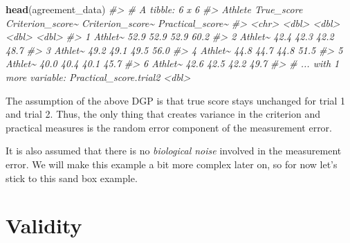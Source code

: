 \documentclass[
]{book}
\newenvironment{Shaded}{\begin{snugshade}}{\end{snugshade}}
\newcommand{\CommentTok}[1]{\textcolor[rgb]{0.56,0.35,0.01}{\textit{#1}}}
\newcommand{\KeywordTok}[1]{\textcolor[rgb]{0.13,0.29,0.53}{\textbf{#1}}}
\newcommand{\NormalTok}[1]{#1}
\begin{document}
\begin{Shaded}
\begin{Highlighting}[]
\KeywordTok{head}\NormalTok{(agreement\_data)}
\CommentTok{\#> \# A tibble: 6 x 6}
\CommentTok{\#>   Athlete True\_score Criterion\_score\textasciitilde{} Criterion\_score\textasciitilde{} Practical\_score\textasciitilde{}}
\CommentTok{\#>   <chr>        <dbl>            <dbl>            <dbl>            <dbl>}
\CommentTok{\#> 1 Athlet\textasciitilde{}       52.9             52.9             52.9             60.2}
\CommentTok{\#> 2 Athlet\textasciitilde{}       42.4             42.3             42.2             48.7}
\CommentTok{\#> 3 Athlet\textasciitilde{}       49.2             49.1             49.5             56.0}
\CommentTok{\#> 4 Athlet\textasciitilde{}       44.8             44.7             44.8             51.5}
\CommentTok{\#> 5 Athlet\textasciitilde{}       40.0             40.4             40.1             45.7}
\CommentTok{\#> 6 Athlet\textasciitilde{}       42.6             42.5             42.2             49.7}
\CommentTok{\#> \# ... with 1 more variable: Practical\_score.trial2 <dbl>}
\end{Highlighting}
\end{Shaded}

The assumption of the above DGP is that true score stays unchanged for trial 1 and trial 2. Thus, the only thing that creates variance in the criterion and practical measures is the random error component of the measurement error.

It is also assumed that there is no \emph{biological noise} involved in the measurement error. We will make this example a bit more complex later on, so for now let's stick to this sand box example.

\hypertarget{validity}{%
\section{Validity}\label{validity}}
\end{document}
